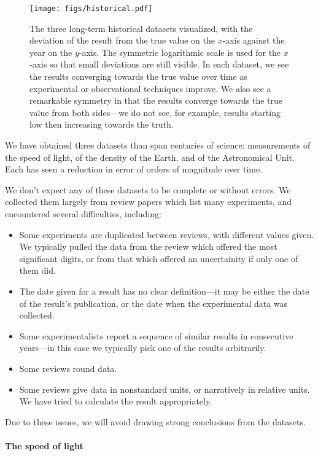\documentclass[12pt]{article}
\begin{document}
\begin{figure}
  \texttt{[image: figs/historical.pdf]}
  \caption{The three long-term historical datasets visualized, with the deviation of the result from the true value on the $x$-axis against the year on the $y$-axis. The symmetric logarithmic scale is used for the $x$-axis so that small deviations are still visible. In each dataset, we see the results converging towards the true value over time as experimental or observational techniques improve. We also see a remarkable symmetry in that the results converge towards the true value from both sides---we do not see, for example, results starting low then increasing towards the truth.}
  \label{fig:historical}
\end{figure}

We have obtained three datasets than span centuries of science: measurements of the speed of light, of the density of the Earth, and of the Astronomical Unit. Each has seen a reduction in error of orders of magnitude over time.

We don't expect any of these datasets to be complete or without errors. We collected them largely from review papers which list many experiments, and encountered several difficulties, including:
\begin{itemize}
  \item Some experiments are duplicated between reviews, with different values given. We typically pulled the data from the review which offered the most significant digits, or from that which offered an uncertainity if only one of them did.
  \item The date given for a result has no clear definition---it may be either the date of the result's publication, or the date when the experimental data was collected.
  \item Some experimentalists report a sequence of similar results in consecutive years---in this case we typically pick one of the results arbitrarily.
  \item Some reviews round data.
  \item Some reviews give data in nonstandard units, or narratively in relative units. We have tried to calculate the result appropriately.
\end{itemize}
Due to these issues, we will avoid drawing strong conclusions from the datasets.

\paragraph{The speed of light}
\end{document}
